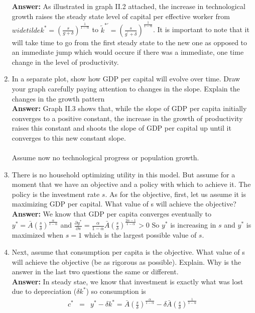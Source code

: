 \documentclass[11pt]{SelfArxOneColBMN}
\begin{document}
\begin{enumerate}
  \textbf{Answer: }As illustrated in graph II.2 attached, the increase in technological growth raises the steady state level of capital per effective worker from $widetilde{k}^* = (\frac{s}{g + \delta})^\frac{1}{1 - \alpha}$ to $\widetilde{k}^{*\prime} = (\frac{s}{g^\prime + \delta})^\frac{1}{1 - \alpha}$. It is important to note that it will take time to go from the first steady state to the new one as opposed to an immediate jump which would occure if there was a immediate, one time change in the level of productivity.
  \item In a separate plot, show how GDP per capital will evolve over time. Draw your graph carefully paying attention to changes in the slope. Explain the changes in the growth pattern\\
  \textbf{Answer: }Graph II.3 shows that, while the slope of GDP per capita initially converges to a positive constant, the increase in the growth of productivity raises this constant and shoots the slope of GDP per capital up until it converges to this new constant slope.\\
  \\
  Assume now no technological progress or population growth.\\
  \item There is no household optimizing utility in this model. But assume for a moment that we have an objective and a policy with which to achieve it. The policy is the investment rate $s$. As for the objective, first, let us assume it is maximizing GDP per capital. What value of s will achieve the objective?\\
  \textbf{Answer: }We know that GDP per capita converges eventually to $y^* = \bar{A}(\frac{s}{\delta})^\frac{\alpha}{1 - \alpha}$ and $\frac{\partial y^*}{\partial s} = \frac{\alpha}{1 - \alpha}\bar{A}(\frac{s}{\delta})^\frac{2\alpha - 1}{1 - \alpha} > 0$ So $y^*$ is increasing in $s$ and $y^*$ is maximized when $s = 1$ which is the largest possible value of $s$.
  \item Next, assume that consumption per capita is the objective. What value of s will achieve the objective (be as rigorous as possible). Explain. Why is the answer in the last two questions the same or different.\\
  \textbf{Answer: }In steady stae, we know that investment is exactly what was lost due to depreciation ($\delta k^*$) so consumption is
  \begin{eqnarray*}
    c^* &=& y^* - \delta k^* = \bar{A}(\frac{s}{\delta})^\frac{\alpha}{1 - \alpha} - \delta \bar{A}(\frac{s}{\delta})^\frac{1}{1 - \alpha}\\

\end{eqnarray*}
\end{enumerate}
\end{document}

